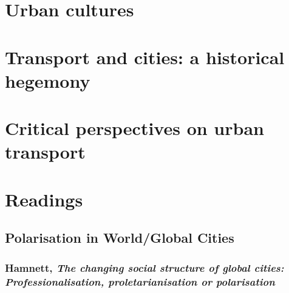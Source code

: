 \documentclass{article}
\begin{document}
\section{Urban cultures}


\section{Transport and cities: a historical hegemony}


\section{Critical perspectives on urban transport}


\section{Readings}

\subsection{Polarisation in World/Global Cities}

\subsubsection{Hamnett, \textit{The changing social structure of global cities: Professionalisation, proletarianisation or polarisation}}
\end{document}
